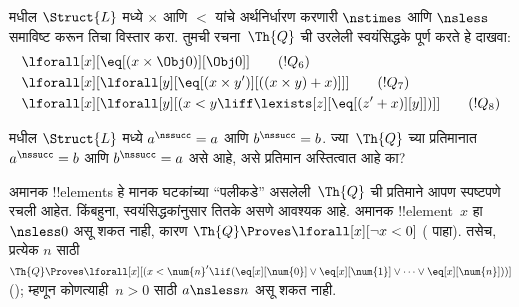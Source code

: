 \documentclass[../../../include/open-logic-section]{subfiles}
\begin{document}
\begin{prob}
 मधील $\Struct{L}$ मध्ये
$\times$ आणि $<$ यांचे अर्थनिर्धारण करणारी $\nstimes$ आणि $\nsless$
समाविष्ट करून तिचा विस्तार करा. तुमची रचना~$\Th{Q}$ ची उरलेली
स्वयंसिद्धके पूर्ण करते हे दाखवा:
\begin{align*}
& \lforall[x][\eq[(x \times \Obj 0)][\Obj 0]] \tag{$!Q_6$}\\ &
  \lforall[x][\lforall[y][\eq[(x \times y')][((x \times y) + x)]]]
  \tag{$!Q_7$}\\ & \lforall[x][\lforall[y][(x < y \liff \lexists[z][\eq[(z'+x)][y]])]] \tag{$!Q_8$}
\end{align*}
\end{prob}

\begin{prob}
 मधील $\Struct{L}$ मध्ये $a^\nssucc
= a$ आणि $b^\nssucc = b$. ज्या~$\Th{Q}$ च्या प्रतिमानात
$a^\nssucc = b$ आणि $b^\nssucc = a$ असे आहे, असे प्रतिमान अस्तित्वात आहे का?
\end{prob}

\begin{explain}
अमानक !!{element}s हे मानक घटकांच्या ``पलीकडे'' असलेली~$\Th{Q}$ ची
प्रतिमाने आपण स्पष्टपणे रचली आहेत. किंबहुना, स्वयंसिद्धकांनुसार तितके असणे
आवश्यक आहे. अमानक !!{element}~$x$ हा ${} \nsless 0$ असू शकत नाही, कारण
$\Th{Q} \Proves \lforall[x][\lnot x<0]$
( पाहा). तसेच, प्रत्येक $n$ साठी
$\Th{Q} \Proves \lforall[x][(x < \num{n}' \lif
(\eq[x][\num{0}] \lor \eq[x][\num{1}] \lor \dots \lor
\eq[x][\num{n}]))]$ (); म्हणून
कोणत्याही~$n>0$ साठी $a \nsless n$ असू शकत नाही.
\end{explain}
\end{document}
